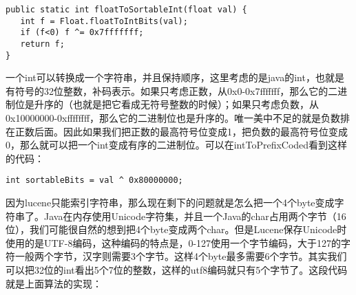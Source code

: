 \begin{verbatim}
public static int floatToSortableInt(float val) {
   int f = Float.floatToIntBits(val);
   if (f<0) f ^= 0x7fffffff;
   return f;
}
\end{verbatim}
\par 一个int可以转换成一个字符串，并且保持顺序，这里考虑的是java的int，也就是有符号的32位整数，补码表示。如果只考虑正数，从0x0-0x7fffffff，那么它的二进制位是升序的（也就是把它看成无符号整数的时候）；如果只考虑负数，从0x10000000-0xffffffff，那么它的二进制位也是升序的。唯一美中不足的就是负数排在正数后面。因此如果我们把正数的最高符号位变成1，把负数的最高符号位变成0，那么就可以把一个int变成有序的二进制位。可以在intToPrefixCoded看到这样的代码：
\begin{verbatim}
int sortableBits = val ^ 0x80000000;
\end{verbatim}
\par 因为lucene只能索引字符串，那么现在剩下的问题就是怎么把一个4个byte变成字符串了。Java在内存使用Unicode字符集，并且一个Java的char占用两个字节（16位），我们可能很自然的想到把4个byte变成两个char。但是Lucene保存Unicode时使用的是UTF-8编码，这种编码的特点是，0-127使用一个字节编码，大于127的字符一般两个字节，汉字则需要3个字节。这样4个byte最多需要6个字节。其实我们可以把32位的int看出5个7位的整数，这样的utf8编码就只有5个字节了。这段代码就是上面算法的实现：

